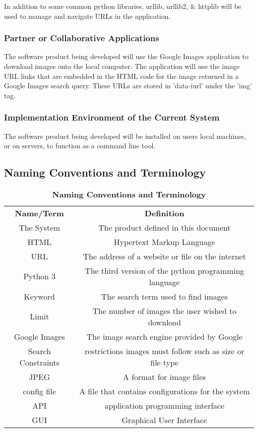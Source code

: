 \documentclass[12pt, titlepage]{article}
\begin{document}
In addition to some common python libraries, urllib, urllib2, \& httplib will be used to manage and navigate URLs in the application.

\subsubsection{Partner or Collaborative Applications}

The software product being developed will use the Google Images application to download images onto the local computer. The application will use the image URL links that are embedded in the HTML code for the image returned in a Google Images search query. These URLs are stored in 'data-iurl' under the 'img' tag.

\subsubsection{Implementation Environment of the Current System}

The software product being developed will be installed on users local machines, or on servers, to function as a command line tool.

\newpage

\subsection{Naming Conventions and Terminology}

\begin{table}[ht]
\caption{\bf Naming Conventions and Terminology}
\begin{tabular}{ |c|c| } 
 \hline
 \textbf{Name/Term} & \textbf{Definition}\\ 
 The System & The product defined in this document\\
 HTML & Hypertext Markup Language \\ 
 URL & The address of a website or file on the internet \\ 
 Python 3 & The third version of the python programming language \\
 Keyword & The search term used to find images\\
 Limit & The number of images the user wished to download\\
 Google Images & The image search engine provided by Google\\
 Search Constraints & restrictions images must follow such as size or file type\\
 JPEG & A format for image files\\ 
 config file & A file that contains configurations for the system\\
 API & application programming interface\\
 GUI & Graphical User Interface\\
 \hline
\end{tabular}
\end{table}
\end{document}

